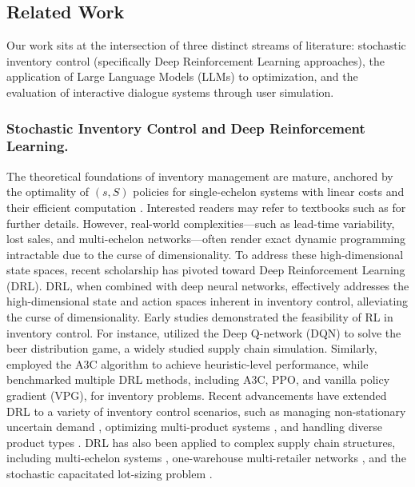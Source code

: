 \subsection{Related Work}
Our work sits at the intersection of three distinct streams of literature: stochastic inventory control (specifically Deep Reinforcement Learning approaches), the application of Large Language Models (LLMs) to optimization, and the evaluation of interactive dialogue systems through user simulation.

\subsubsection{Stochastic Inventory Control and Deep Reinforcement Learning.}
The theoretical foundations of inventory management are mature, anchored by the optimality of $(s, S)$ policies for single-echelon systems with linear costs \citep{scarf1960optimality} and their efficient computation \citep{axsater2006inventory}. Interested readers may refer to textbooks such as \cite{simchi2005logic} for further details. However, real-world complexities—such as lead-time variability, lost sales, and multi-echelon networks—often render exact dynamic programming intractable due to the curse of dimensionality.
To address these high-dimensional state spaces, recent scholarship has pivoted toward Deep Reinforcement Learning (DRL). DRL, when combined with deep neural networks, effectively addresses the high-dimensional state and action spaces inherent in inventory control, alleviating the curse of dimensionality. Early studies demonstrated the feasibility of RL in inventory control. For instance, \cite{oroojlooyjadid2022deep} utilized the Deep Q-network (DQN) to solve the beer distribution game, a widely studied supply chain simulation. Similarly, \cite{gijsbrechts2022can} employed the A3C algorithm to achieve heuristic-level performance, while \cite{stranieri2023comparing} benchmarked multiple DRL methods, including A3C, PPO, and vanilla policy gradient (VPG), for inventory problems. Recent advancements have extended DRL to a variety of inventory control scenarios, such as managing non-stationary uncertain demand \citep{dehaybe2024deep, park2023adaptive}, optimizing multi-product systems \citep{sultana2020reinforcement, selukar2022inventory}, and handling diverse product types \citep{meisheri2020using, meisheri2022scalable}. DRL has also been applied to complex supply chain structures, including multi-echelon systems \citep{wu2023distributional, alvo2023neural, liu2024reinforcement, stranieri2024combining}, one-warehouse multi-retailer networks \citep{kaynov2024deep}, and the stochastic capacitated lot-sizing problem \citep{van2023using}.



